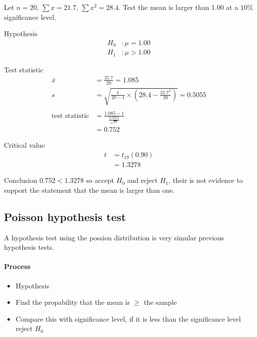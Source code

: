         \begin{example}
        {
            Let $n = 20$, $\sum{x} = 21.7$, $\sum{x^2} = 28.4$. Test the mean is larger than 1.00 at a 10\% significance level.
        }

        \begin{step}{Hypothesis}
        \begin{align*}
        H_0&: \mu = 1.00\\
        H_1&: \mu > 1.00
        \end{align*}
        \end{step}

        \begin{step}{Test statistic}
        \begin{align*}
        \bar{x} &= \frac{21.7}{20} = 1.085 \\
        s &= \sqrt{\frac{1}{20 - 1} \times (28.4 - \frac{21.7^2}{20})} = 0.5055 \\ 
        \\
        \text{test statistic} &= \frac{1.085 - 1}{\frac{0.5055}{\sqrt{20}}} \\
        &= 0.752
        \end{align*}
        \end{step}

        \begin{step}{Critical value}
        \begin{align*}
        t &= t_{19}(0.90) \\ 
        &= 1.3278
        \end{align*}
        \end{step}

        \begin{step}{Conclusion}
        $0.752 < 1.3278$ so accept $H_0$ and reject $H_1$, their is not evidence to support the statement that the mean is larger than one.
        \end{step}

        \end{example}

    \newpage
    \subsection{Poisson hypothesis test}
        A hypothesis test using the possion distribution is very simular previous hypothesis tests.

        \paragraph{Process}
        \begin{itemize}
        \item Hypothesis
        \item Find the propability that the mean is $\geq$ the sample
        \item Compare this with significance level, if it is less than the significance level reject $H_0$
        \end{itemize}

